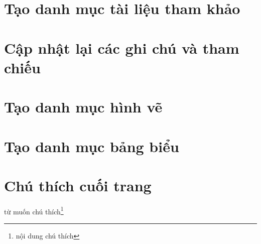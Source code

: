 \section{Tạo danh mục tài liệu tham khảo}
\label{sec:taodanhmuc}

\section{Cập nhật lại các ghi chú và tham chiếu}
\label{sec:capnhat}

\section{Tạo danh mục hình vẽ}
\label{sec:hinhve}

\section{Tạo danh mục bảng biểu}
\label{sec:bangbieu}

\section{Chú thích cuối trang}
\label{sec:chuthich}
\renewcommand{\thefootnote}{**}
từ muốn chú thích\footnote{nội dung chú thích}

